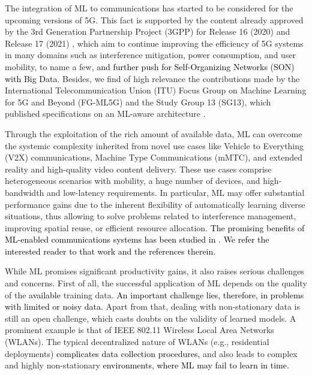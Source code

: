 \documentclass[journal]{IEEEtran}
\begin{document}
	The integration of ML to communications has started to be considered for the upcoming versions of 5G. This fact is supported by the content already approved by the 3rd Generation Partnership Project (3GPP) for Release 16 (2020) and Release 17 (2021) \cite{3gpp2019study}, which aim to continue improving the efficiency of 5G systems in many domains such as interference mitigation, power consumption, and user mobility, to name a few\textcolor{black}{, and further push for Self-Organizing Networks (SON) with Big Data}. Besides, we find of high relevance the contributions made by the International Telecommunication Union (ITU) Focus Group on Machine Learning for 5G and Beyond (FG-ML5G) and the Study Group 13 (SG13), which published specifications on an ML-aware architecture \cite{ITU3172, ITU3174}.
	
	Through the exploitation of the rich amount of available data, ML can overcome the systemic complexity inherited from novel use cases like Vehicle to Everything (V2X) communications, Machine Type Communications (mMTC), and extended reality and high-quality video content delivery. These use cases comprise heterogeneous scenarios with mobility, a huge number of devices, and high-bandwidth and low-latency requirements. In particular, ML may offer substantial performance gains due to the inherent flexibility of automatically learning diverse situations, thus allowing to solve problems related to interference management, improving spatial reuse, or efficient resource allocation. \textcolor{black}{The promising benefits of ML-enabled communications systems has been studied in \cite{itu_architecture}. We refer the interested reader to that work and the references therein.}
	
	While ML promises significant productivity gains, it also raises serious challenges and concerns. First of all, the successful application of ML depends on the quality of the \textcolor{black}{available} training data. \textcolor{black}{An important challenge lies, therefore, in problems with limited or noisy data.} Apart from that, dealing with non-stationary data is still an open challenge, which casts doubts on the validity of learned models. A prominent example is that of IEEE 802.11 Wireless Local Area Networks (WLANs). The typical decentralized nature of WLANs (e.g., residential deployments) \textcolor{black}{complicates data collection procedures, }and also leads to complex and highly non-stationary \textcolor{black}{environments, where ML may fail to learn in time.}
	
\end{document}
